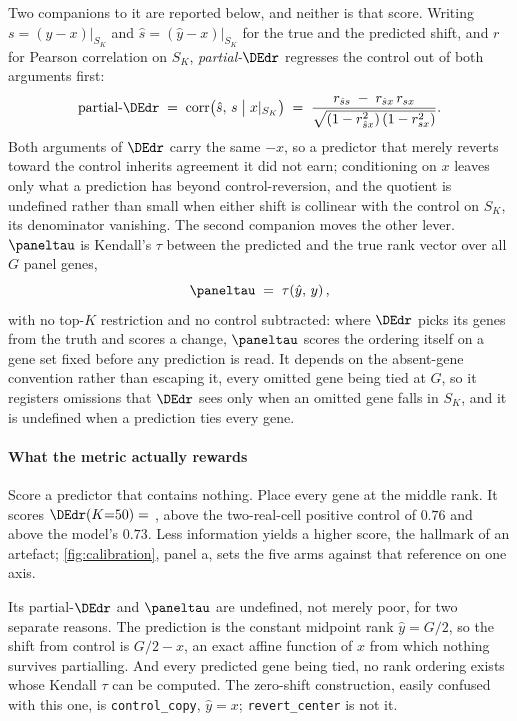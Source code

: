 Two companions to it are reported below, and neither is that score. Writing
$s = (y-x)|_{S_K}$ and $\hat{s} = (\hat{y}-x)|_{S_K}$ for the true and the
predicted shift, and $r$ for Pearson correlation on $S_K$,
\emph{partial-}$\DEdr$ regresses the control out of both arguments first:
\begin{equation}
 \textrm{partial-}\DEdr \;=\;
 \operatorname{corr}\!\big( \hat{s}, \, s \;\big|\; x|_{S_K} \big)
 \;=\;
 \frac{r_{\hat{s}s} \;-\; r_{\hat{s}x}\, r_{sx}}
      {\sqrt{\left(1 - r_{\hat{s}x}^{2}\right)\left(1 - r_{sx}^{2}\right)}}.
\end{equation}
Both arguments of $\DEdr$ carry the same $-x$, so a predictor that merely
reverts toward the control inherits agreement it did not earn; conditioning on
$x$ leaves only what a prediction has beyond control-reversion, and the quotient
is undefined rather than small when either shift is collinear with the control
on $S_K$, its denominator vanishing. The second companion moves the other lever.
$\paneltau$ is Kendall's $\tau$ between the predicted and the true rank vector
over all $G$ panel genes,
\begin{equation}
 \paneltau \;=\; \tau\!\left(\hat{y}, \, y\right),
\end{equation}
with no top-$K$ restriction and no control subtracted: where $\DEdr$ picks its
genes from the truth and scores a change, $\paneltau$ scores the ordering itself
on a gene set fixed before any prediction is read. It depends on the absent-gene
convention rather than escaping it, every omitted gene being tied at $G$, so it
registers omissions that $\DEdr$ sees only when an omitted gene falls in $S_K$,
and it is undefined when a prediction ties every gene.

\paragraph{What the metric actually rewards} Score a predictor that contains
nothing. Place every gene at the middle rank. It scores $\DEdr(K{=}50) =$
, above the two-real-cell positive control of
$0.76$ and above the model's $0.73$. Less information yields a higher score,
the hallmark of an artefact; \cref{fig:calibration}, panel a, sets the five arms
against that reference on one axis.

Its partial-$\DEdr$ and $\paneltau$ are undefined, not merely poor, for two
separate reasons. The prediction is the constant midpoint rank $\hat y = G/2$,
so the shift from control is $G/2 - x$, an exact affine function of $x$ from
which nothing survives partialling. And every predicted gene being tied, no rank
ordering exists whose Kendall $\tau$ can be computed. The zero-shift
construction, easily confused with this one, is \texttt{control\_copy},
$\hat y = x$; \texttt{revert\_center} is not it.

